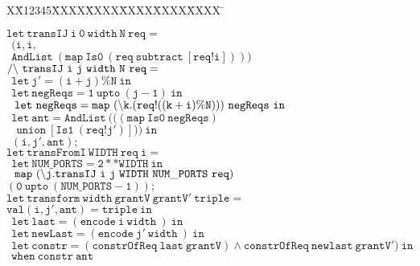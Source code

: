 \documentclass{article}
\newlength{\fminilength}
\newenvironment{fmini}[1][\linewidth]
  {\setlength{\fminilength}{#1\fboxsep-2\fboxrule}%
   \vspace{2ex}\noindent\begin{lrbox}{\fminibox}\begin{minipage}{\fminilength}%
   \mbox{ }\hfill\vspace{-2.5ex}}%
  {\end{minipage}\end{lrbox}\vspace{1ex}\hspace{0ex}%
   \framebox{\usebox{\fminibox}}}
\newenvironment{specification}
{\noindent\footnotesize\tt\begin{fmini}\begin{tabbing}X\=X12345\=XXXX\=XXXX\=XXXX\=XXXX\=XXXX
\=\+\kill} {\end{tabbing}\normalfont\end{fmini}}
\begin{document}
\vspace{2mm}
\begin{specification}

 

  $\mathtt{let\ transIJ\ i\ 0\ width\ N\ req =}$\\

$\mathtt{\ \ (i,i,}$\\

$\mathtt{\ \ AndList\ (map\ Is0\ (req\ subtract\ [req !i])) )}$\\



$\mathtt{/\mbox{$\backslash$}\ transIJ\ i\ j\ width\ N\ req=}$\\

$\mathtt{\ \ let\ j'=(i+j)\% N\ in}$\\

$\mathtt{\ \ let\ negReqs=1\ upto\ (j - 1)\ in}$\\

$\mathtt{\ \ let\ negReqs=map\ (\mbox{$\backslash$}k. (req ! ((
k + i) \% N)))\ negReqs\ in}$\\

$\mathtt{\ \ let\ ant=AndList\ (((map\ Is0\ negReqs)}$\\

$\ \ \ \ \mathtt{union\ [Is1\ (req ! j')]) )\ in}$\\



$\mathtt{\ \ (i,j' , ant);}$\\



$\mathtt{let\ transFromI\ WIDTH\ req\ i =}$\\

$\mathtt{\ \ let\ NUM\_PORTS=2**WIDTH\ in}$\\

$\mathtt{\ \ map\ (\mbox{$\backslash$}j. transIJ\ i\ j\
WIDTH\ NUM\_PORTS\ req)}$\\

$\mathtt{ (0\ upto\ (NUM\_PORTS-1));}$\\

$\mathtt{let\ transform\  width\ grantV\ grantV'\ triple=}$\\
$ \mathtt{val (i,j',ant)=triple\ in}$\\
$\mathtt{\ \ let\ last=(encode\ i\ width\ )\ in}$\\
  $\mathtt{\ \ let\ newLast=(encode\ j'\ width\ )\ in}$\\
  $\mathtt{\ \ let\ constr=(constrOfReq\ last \ grantV )\wedge constrOfReq\ newlast \ grantV' )\ in}$\\
   $\mathtt{\ \ when\  constr\  ant}$\\



\end{specification}
\end{document}
